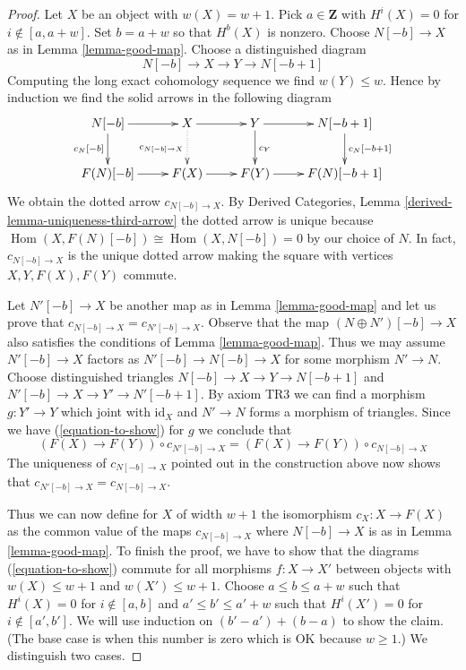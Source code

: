 \documentclass{stacks-project}
\theoremstyle{plain}
\theoremstyle{definition}
\theoremstyle{remark}
\numberwithin{equation}{subsection}
\def\Hom{\mathop{\mathrm{Hom}}\nolimits}
\begin{document}
\begin{proof}
\medskip\noindent
Let $X$ be an object with $w(X) = w + 1$. Pick $a \in \mathbf{Z}$ with
$H^i(X) = 0$ for $i \not \in [a, a + w]$. Set $b = a + w$ so that
$H^b(X)$ is nonzero. Choose $N[-b] \to X$ as in Lemma \ref{lemma-good-map}.
Choose a distinguished diagram
$$
N[-b] \to X \to Y \to N[-b + 1]
$$
Computing the long exact cohomology sequence we find
$w(Y) \leq w$. Hence by induction we find the solid arrows
in the following diagram
$$
\xymatrix{
N[-b] \ar[r] \ar[d]_{c_N[-b]} &
X \ar[r] \ar@{..>}[d]_{c_{N[-b] \to X}} &
Y \ar[r] \ar[d]^{c_Y} &
N[-b + 1] \ar[d]^{c_N[-b + 1]} \\
F(N)[-b] \ar[r] &
F(X) \ar[r] &
F(Y) \ar[r] &
F(N)[-b + 1]
}
$$
We obtain the dotted arrow $c_{N[-b] \to X}$.
By Derived Categories, Lemma \ref{derived-lemma-uniqueness-third-arrow}
the dotted arrow is unique because $\Hom(X, F(N)[-b]) \cong \Hom(X, N[-b]) = 0$
by our choice of $N$. In fact, $c_{N[-b] \to X}$ is the unique dotted
arrow making the square with vertices $X, Y, F(X), F(Y)$ commute.

\medskip\noindent
Let $N'[-b] \to X$ be another map as in Lemma \ref{lemma-good-map}
and let us prove that $c_{N[-b] \to X} = c_{N'[-b] \to X}$.
Observe that the map $(N \oplus N')[-b] \to X$ also satisfies the
conditions of Lemma \ref{lemma-good-map}.
Thus we may assume $N'[-b] \to X$ factors
as $N'[-b] \to N[-b] \to X$ for some morphism $N' \to N$.
Choose distinguished triangles $N[-b] \to X \to Y \to N[-b + 1]$ and
$N'[-b] \to X \to Y' \to N'[-b + 1]$. By axiom TR3 we can find
a morphism $g : Y' \to Y$ which joint with $\text{id}_X$ and $N' \to N$
forms a morphism of triangles. Since we have
(\ref{equation-to-show}) for $g$ we conclude that
$$
(F(X) \to F(Y)) \circ c_{N'[-b] \to X} = (F(X) \to F(Y)) \circ c_{N[-b] \to X}
$$
The uniqueness of $c_{N[-b] \to X}$ pointed out in the construction
above now shows that $c_{N'[-b] \to X} = c_{N[-b] \to X}$.

\medskip\noindent
Thus we can now define for $X$ of width $w + 1$ the isomorphism
$c_X : X \to F(X)$ as the common value of the maps $c_{N[-b] \to X}$
where $N[-b] \to X$ is as in Lemma \ref{lemma-good-map}. To finish
the proof, we have to show that the diagrams (\ref{equation-to-show})
commute for all morphisms $f : X \to X'$ between objects with $w(X) \leq w + 1$
and $w(X') \leq w + 1$. Choose $a \leq b \leq a + w$ such that
$H^i(X) = 0$ for $i \not \in [a, b]$ and
$a' \leq b' \leq a' + w$ such that $H^i(X') = 0$ for
$i \not \in [a', b']$. We will use induction on
$(b' - a') + (b - a)$ to show the claim. (The base case
is when this number is zero which is OK because $w \geq 1$.)
We distinguish two cases.


\end{proof}
\end{document}

